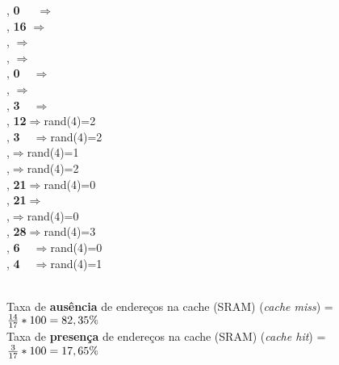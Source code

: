 \begin{tabbing}
\cache{\Lambda}{\Lambda}{\Lambda}{\Lambda}, \hspace{5cm}\= {\bf 0\ \ } $\Rightarrow$\miss\hspace{1.5cm}\=\\
,\> {\bf 16} $\Rightarrow$\miss\\
, $\Rightarrow$\miss\\
, $\Rightarrow$ \HIT \\
 ,\> {\bf 0\ \ }$\Rightarrow$ \HIT \\
 , $\Rightarrow$\miss\\
,\> {\bf 3\ \ }$\Rightarrow$\miss \\
,\> {\bf 12}$\Rightarrow$\miss \>rand(4)=2\\
,\> {\bf 3\ \ }$\Rightarrow$\miss \>rand(4)=2\\
,$\Rightarrow$\miss\>rand(4)=1\\
,$\Rightarrow$\miss\>rand(4)=2\\
,\> {\bf 21}$\Rightarrow$\miss\>rand(4)=0\\
,\> {\bf 21}$\Rightarrow$\HIT\\
,$\Rightarrow$\miss\>rand(4)=0\\
,\> {\bf 28}$\Rightarrow$\miss \>rand(4)=3\\
,\> {\bf 6\ \ }$\Rightarrow$\miss \>rand(4)=0\\
,\> {\bf 4\ \ }$\Rightarrow$\miss \>rand(4)=1\\
\\
\end{tabbing}



Taxa de {\bf ausência} de endereços na cache (SRAM) ({\em cache miss}) =
${14 \over 17} * 100 = 82,35\%$ \\

Taxa de {\bf presença} de endereços na cache (SRAM) ({\em cache hit}) = ${3
  \over 17} * 100 = 17,65\%$\\

